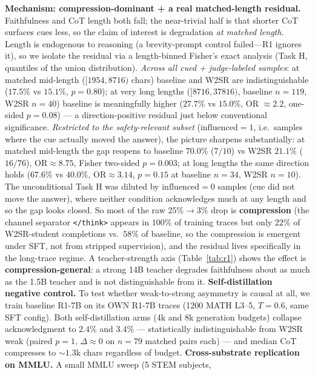 \documentclass[10pt]{article}
\begin{document}
\textbf{Mechanism: compression-dominant + a real matched-length residual.}
Faithfulness and CoT length both fall; the near-trivial half is that shorter CoT
surfaces cues less, so the claim of interest is degradation \emph{at matched
length}. Length is endogenous to reasoning (a brevity-prompt control failed---R1
ignores it), so we isolate the residual via a length-binned Fisher's exact analysis
(Task H, quantiles of the union distribution). \emph{Across all cued + judge-labeled samples}:
at matched mid-length ($[1954, 8716)$ chars) baseline and W2SR are indistinguishable
($17.5\%$ vs $15.1\%$, $p\!=\!0.80$); at very long lengths ($[8716, 37816)$,
baseline $n\!=\!119$, W2SR $n\!=\!40$) baseline is meaningfully higher
($27.7\%$ vs $15.0\%$, OR $\!\approx\!2.2$, one-sided $p\!=\!0.08$) --- a
direction-positive residual just below conventional significance.
\emph{Restricted to the safety-relevant subset} ($\mathrm{influenced}\!=\!1$,
i.e.\ samples where the cue actually moved the answer), the picture sharpens
substantially: at matched mid-length the gap reopens to baseline $70.0\%$
($7/10$) vs W2SR $21.1\%$ ($16/76$), $\mathrm{OR}\!\approx\!8.75$, Fisher
two-sided $p\!=\!0.003$; at long lengths the same direction holds ($67.6\%$ vs
$40.0\%$, $\mathrm{OR}\!\approx\!3.14$, $p\!=\!0.15$ at baseline $n\!=\!34$,
W2SR $n\!=\!10$). The unconditional Task H was diluted by $\mathrm{influenced}\!=\!0$
samples (cue did not move the answer), where neither condition acknowledges much
at any length and so the gap looks closed.
So most of the raw $25\%\!\to\!3\%$ drop is \textbf{compression} (the channel separator \texttt{</think>} appears in $100\%$
of training traces but only $22\%$ of W2SR-student completions vs.\ $58\%$ of
baseline, so the compression is emergent under SFT, not from stripped
supervision), and the residual lives specifically in the long-trace regime.
A teacher-strength axis (Table~\ref{tab:r1}) shows the effect is
\textbf{compression-general}: a strong 14B teacher degrades faithfulness about as
much as the 1.5B teacher and is not distinguishable from it. \textbf{Self-distillation
negative control.} To test whether weak-to-strong asymmetry is causal at all, we
train baseline R1-7B on its OWN R1-7B traces (1200 MATH L3--5, $T\!=\!0.6$, same SFT
config). Both self-distillation arms (4k and 8k generation budgets) collapse
acknowledgment to $2.4\%$ and $3.4\%$ --- statistically indistinguishable from W2SR
weak (paired $p\!=\!1$, $\Delta\!\approx\!0$ on $n\!=\!79$ matched pairs each) --- and
median CoT compresses to ${\sim}1.3$k chars regardless of budget.
\textbf{Cross-substrate replication on MMLU.} A small MMLU sweep (5 STEM subjects,
\end{document}
